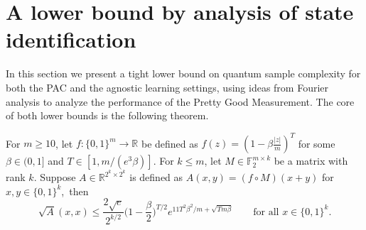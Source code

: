 \documentclass[twoside,11pt]{article}
\newcommand{\F}{\ensuremath{\mathbb{F}}}
\newcommand{\R}{\ensuremath{\mathbb{R}}}
\def\01{\{0,1\}}
\begin{document}
\section{A lower bound by analysis of state identification}
\label{section:stateident}


In this section we present a tight lower bound on quantum sample complexity for both the PAC and the agnostic learning settings, using ideas from Fourier analysis to analyze the performance of the Pretty Good Measurement. The core of both lower bounds is the following theorem.

\begin{theorem}
	\label{thm:upperboundonsqrtGram}
	For $m\geq 10$, let $f:\01^m\rightarrow \R$ be defined as $f(z)=(1-\beta\frac{|z|}{m})^T$ for some $\beta\in (0,1]$ and $T\in [1, m/(e^3\beta)]$. For $k\leq m$, let $M\in \F_2^{m\times k}$ be a matrix with rank $k$. Suppose $A\in \R^{2^{k}\times 2^{k}}$ is defined as $A(x,y)=(f\circ M)(x+ y)$ for $x,y\in \01^k$,~then 
	$$
	\sqrt{A}(x,x)\leq  \frac{2\sqrt{e}}{2^{k/2}}\Big(1-\frac{\beta}{2}\Big)^{T/2} e^{11T^2\beta^2/m+\sqrt{Tm\beta}}    \qquad \text{for all } x\in \01^k.
	$$
\end{theorem}
\end{document}
